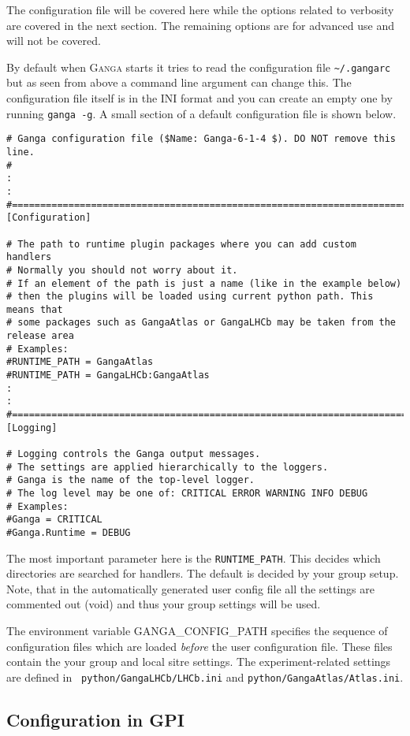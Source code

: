 \documentclass{howto}
\def\ganga {\textsc{Ganga}\xspace}
\begin{document}
The configuration file will be covered here while the options related to
verbosity are covered in the next section. The remaining options are for
advanced use and will not be covered.

By default when \ganga starts  it tries to read the configuration file
\texttt{\~{}/.gangarc} but  as seen from  above a command  line argument
can change  this. The configuration file  itself is in  the INI format
and you can create an empty  one by running \texttt{ganga -g}. A small
section of a default configuration file is shown below.

\begin{verbatim}
# Ganga configuration file ($Name: Ganga-6-1-4 $). DO NOT remove this line.
#
:
:
#=======================================================================
[Configuration]

# The path to runtime plugin packages where you can add custom handlers
# Normally you should not worry about it.
# If an element of the path is just a name (like in the example below)
# then the plugins will be loaded using current python path. This means that
# some packages such as GangaAtlas or GangaLHCb may be taken from the release area
# Examples:
#RUNTIME_PATH = GangaAtlas
#RUNTIME_PATH = GangaLHCb:GangaAtlas
:
:
#=======================================================================
[Logging]

# Logging controls the Ganga output messages.
# The settings are applied hierarchically to the loggers.
# Ganga is the name of the top-level logger.
# The log level may be one of: CRITICAL ERROR WARNING INFO DEBUG
# Examples:
#Ganga = CRITICAL
#Ganga.Runtime = DEBUG
\end{verbatim}

The most  important parameter here is  the \texttt{RUNTIME_PATH}. This
decides which  directories are searched  for handlers. The  default is
decided by your group setup. Note, that in the automatically generated
user config  file all the settings  are commented out  (void) and thus
your group settings will be used. 

The environment  variable GANGA_CONFIG_PATH specifies  the sequence of
configuration   files  which   are  loaded   {\it  before}   the  user
configuration  file.  These  files contain  the your  group  and local
sitre settings.   The experiment-related settings are  defined in {\tt
python/GangaLHCb/LHCb.ini} and {\tt python/GangaAtlas/Atlas.ini}.

\subsection{Configuration in GPI}
\end{document}
